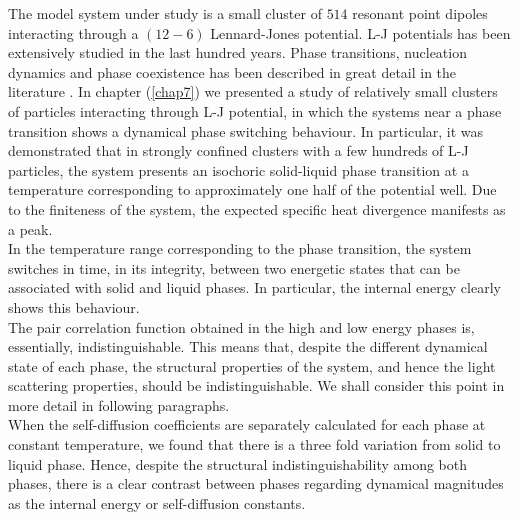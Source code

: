 The model system under study is a small cluster of $514$ resonant point dipoles interacting through a $\left(12-6\right)$ Lennard-Jones potential. L-J potentials has been extensively studied in the last hundred years. Phase transitions, nucleation dynamics and phase coexistence has been described in great detail in the literature \cite{Hansen:1969tn,Honeycutt:1987,panagiotopoulos1994molecular}.
In chapter (\ref{chap7}) we presented a study of relatively small clusters of particles interacting through L-J potential, in which the systems near a phase transition shows a dynamical phase switching behaviour. In particular, it was demonstrated that in strongly confined clusters with a few hundreds of L-J particles, the system presents an isochoric solid-liquid phase transition at a temperature corresponding to approximately one half of the potential well. Due to the finiteness of the system, the expected specific heat divergence manifests as a peak.\\
In the temperature range corresponding to the phase transition, the system switches in time, in its integrity, between two energetic states that can be associated with solid and liquid phases. In particular, the internal energy clearly shows this behaviour.\\
The pair correlation function obtained in the high and low energy phases is, essentially, indistinguishable. This means that, despite the different dynamical state of each phase, the structural properties of the system, and hence the light scattering properties, should be indistinguishable. We shall consider this point in more detail in following paragraphs.\\
When the self-diffusion coefficients are separately calculated for each phase at constant temperature, we found that there is a three fold variation from solid to liquid phase. Hence, despite the structural indistinguishability among both phases, there is a clear contrast between phases regarding dynamical magnitudes as the internal energy or self-diffusion constants.

